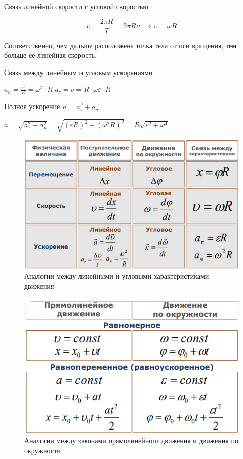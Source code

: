 \begin{remark}
    Связь линейной скорости с угловой скоростью.

    $$
    \upsilon=\frac{2\pi R}{T}=2\pi R\nu \implies \upsilon=\omega R
    $$

    Соответственно, чем дальше расположена точка тела от оси вращения, тем больше её линейная скорость.
\end{remark}

\begin{remark}
    Связь между линейным и угловым ускорениями

    $a_n = \frac{v^2}{R} = \omega^2\cdot R$
    $a_\tau = \dot{v} = R \cdot \dot{\omega} \varepsilon \cdot R$

    Полное ускорение $\vec{a} = \vec{a_\tau} + \vec{a_n}$

    $a = \sqrt{a_\tau^2 + a_n^2} = \sqrt{(\varepsilon R)^2 + (\omega^2 R)^2} = R\sqrt{\varepsilon^2+\omega^4}$
\end{remark}

\begin{figure}[h]
    \centering
    \includegraphics[width=0.5\linewidth]{imgs/q2i3.png}
    \caption{Аналогии между линейными и угловыми характеристиками движения}
\end{figure}

\begin{figure}[h]
    \centering
    \includegraphics[width=0.5\linewidth]{imgs/q2i4.png}
    \caption{Аналогии между законами прямолинейного движения и движения по окружности}
\end{figure}